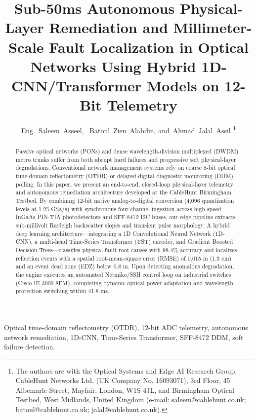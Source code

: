 \documentclass[journal]{IEEEtran}
\begin{document}
\title{Sub-50ms Autonomous Physical-Layer Remediation and Millimeter-Scale Fault Localization in Optical Networks Using Hybrid 1D-CNN/Transformer Models on 12-Bit Telemetry}

\author{Eng.~Saleem~Asseel,~ Batoul~Zien~Alabdin, and~Ahmad~Jalal~Assil%
\thanks{The authors are with the Optical Systems and Edge AI Research Group, CableHunt Networks Ltd. (UK Company No. 16093071), 3rd Floor, 45 Albemarle Street, Mayfair, London, W1S 4JL, and Birmingham Optical Testbed, West Midlands, United Kingdom (e-mail: saleem@cablehunt.co.uk; batoul@cablehunt.co.uk; jalal@cablehunt.co.uk).}}

\maketitle

\begin{abstract}
Passive optical networks (PONs) and dense wavelength-division multiplexed (DWDM) metro trunks suffer from both abrupt hard failures and progressive soft physical-layer degradations. Conventional network management systems rely on coarse 8-bit optical time-domain reflectometry (OTDR) or delayed digital diagnostic monitoring (DDM) polling. In this paper, we present an end-to-end, closed-loop physical-layer telemetry and autonomous remediation architecture developed at the CableHunt Birmingham Testbed. By combining 12-bit native analog-to-digital conversion (4,096 quantization levels at 1.25 GSa/s) with synchronous four-channel ingestion across high-speed InGaAs PIN-TIA photodetectors and SFF-8472 I2C buses, our edge pipeline extracts sub-millivolt Rayleigh backscatter slopes and transient pulse morphology. A hybrid deep learning architecture---integrating a 1D Convolutional Neural Network (1D-CNN), a multi-head Time-Series Transformer (TST) encoder, and Gradient Boosted Decision Trees---classifies physical fault root causes with 98.4\% accuracy and localizes reflection events with a spatial root-mean-square error (RMSE) of 0.015 m (1.5 cm) and an event dead zone (EDZ) below 0.8 m. Upon detecting anomalous degradation, the engine executes an automated Netmiko/SSH control loop on industrial switches (Cisco IE-3000-8FM), completing dynamic optical power adaptation and wavelength protection switching within 41.8 ms.
\end{abstract}

\begin{IEEEkeywords}
Optical time-domain reflectometry (OTDR), 12-bit ADC telemetry, autonomous network remediation, 1D-CNN, Time-Series Transformer, SFF-8472 DDM, soft failure detection.
\end{IEEEkeywords}
\end{document}
